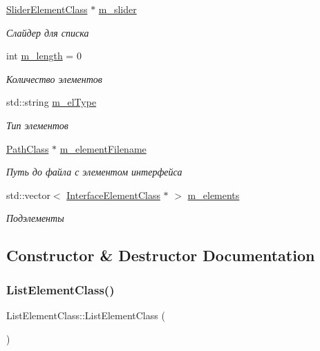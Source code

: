 \begin{DoxyCompactItemize}
\hyperlink{class_slider_element_class}{Slider\+Element\+Class} $\ast$ \hyperlink{class_list_element_class_a6cf5edcbf37cf6607f7c8831e647adff}{m\+\_\+slider}
\begin{DoxyCompactList}\small\item\em Слайдер для списка \end{DoxyCompactList}\item 
int \hyperlink{class_list_element_class_a69a5c62c3e7a04ddab397d4e4bf68006}{m\+\_\+length} = 0
\begin{DoxyCompactList}\small\item\em Количество элементов \end{DoxyCompactList}\item 
std\+::string \hyperlink{class_list_element_class_a8a715337878c21090e94ef9cb6413b0e}{m\+\_\+el\+Type}
\begin{DoxyCompactList}\small\item\em Тип элементов \end{DoxyCompactList}\item 
\hyperlink{class_path_class}{Path\+Class} $\ast$ \hyperlink{class_list_element_class_ad697730fdaec14d4f388b1a16f93debf}{m\+\_\+element\+Filename}
\begin{DoxyCompactList}\small\item\em Путь до файла с элементом интерфейса \end{DoxyCompactList}\item 
std\+::vector$<$ \hyperlink{class_interface_element_class}{Interface\+Element\+Class} $\ast$ $>$ \hyperlink{class_list_element_class_a7a1835c1e6e89b397b53c33ee5c6bbdb}{m\+\_\+elements}
\begin{DoxyCompactList}\small\item\em Подэлементы \end{DoxyCompactList}\end{DoxyCompactItemize}


\subsection{Constructor \& Destructor Documentation}
\mbox{\label{class_list_element_class_a664f29e4c557a150f19c8209cfbf86f2}} 
\subsubsection{\texorpdfstring{List\+Element\+Class()}{ListElementClass()}\hspace{0.1cm}{\footnotesize\ttfamily [1/2]}}
{\footnotesize\ttfamily List\+Element\+Class\+::\+List\+Element\+Class (\begin{DoxyParamCaption}{ }\end{DoxyParamCaption})}

